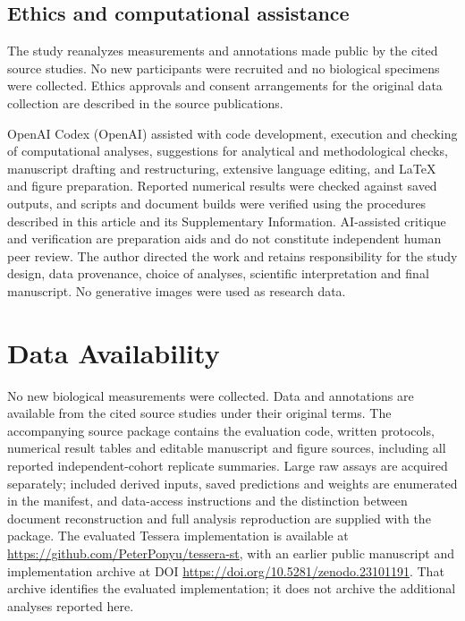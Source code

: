 \documentclass[11pt]{article}
\begin{document}
\subsection{Ethics and computational assistance}
The study reanalyzes measurements and annotations made public by the cited source studies. No new participants were recruited and no biological specimens were collected. Ethics approvals and consent arrangements for the original data collection are described in the source publications.

OpenAI Codex (OpenAI) assisted with code development, execution and checking of computational analyses, suggestions for analytical and methodological checks, manuscript drafting and restructuring, extensive language editing, and LaTeX and figure preparation. Reported numerical results were checked against saved outputs, and scripts and document builds were verified using the procedures described in this article and its Supplementary Information. AI-assisted critique and verification are preparation aids and do not constitute independent human peer review. The author directed the work and retains responsibility for the study design, data provenance, choice of analyses, scientific interpretation and final manuscript. No generative images were used as research data.





\section*{Data Availability}
No new biological measurements were collected. Data and annotations are available from the cited source studies under their original terms. The accompanying source package contains the evaluation code, written protocols, numerical result tables and editable manuscript and figure sources, including all reported independent-cohort replicate summaries. Large raw assays are acquired separately; included derived inputs, saved predictions and weights are enumerated in the manifest, and data-access instructions and the distinction between document reconstruction and full analysis reproduction are supplied with the package. The evaluated Tessera implementation is available at \url{https://github.com/PeterPonyu/tessera-st}, with an earlier public manuscript and implementation archive at DOI \url{https://doi.org/10.5281/zenodo.23101191}. That archive identifies the evaluated implementation; it does not archive the additional analyses reported here.
\end{document}
